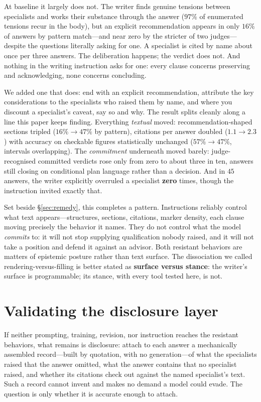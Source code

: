 \documentclass[11pt]{article}
\begin{document}
At baseline it largely does not. The writer finds genuine tensions between
specialists and works their substance through the answer ($97\%$ of
enumerated tensions recur in the body), but an explicit recommendation
appears in only $16\%$ of answers by pattern match---and near zero by the
stricter of two judges---despite the questions literally asking for one. A
specialist is cited by name about once per three answers. The deliberation
happens; the verdict does not. And nothing in the writing instruction asks
for one: every clause concerns preserving and acknowledging, none concerns
concluding.

We added one that does: end with an explicit recommendation, attribute the
key considerations to the specialists who raised them by name, and where you
discount a specialist's caveat, say so and why. The result splits cleanly
along a line this paper keeps finding. Everything \emph{textual} moved:
recommendation-shaped sections tripled ($16\% \rightarrow 47\%$ by pattern),
citations per answer doubled ($1.1 \rightarrow 2.3$) with accuracy on
checkable figures statistically unchanged ($57\% \rightarrow 47\%$,
intervals overlapping). The \emph{commitment} underneath moved barely:
judge-recognised committed verdicts rose only from zero to about three in
ten, answers still closing on conditional plan language rather than a
decision. And in $45$ answers, the writer explicitly overruled a specialist
\textbf{zero} times, though the instruction invited exactly that.

Set beside \S\ref{sec:remedy}, this completes a pattern. Instructions
reliably control what text appears---structures, sections, citations, marker
density, each clause moving precisely the behavior it names. They do not
control what the model \emph{commits} to: it will not stop supplying
qualification nobody raised, and it will not take a position and defend it
against an advisor. Both resistant behaviors are matters of epistemic
posture rather than text surface. The dissociation we called
rendering-versus-filling is better stated as \textbf{surface versus
stance}: the writer's surface is programmable; its stance, with every tool
tested here, is not.

\section{Validating the disclosure layer}
\label{sec:manifest}
If neither prompting, training, revision, nor instruction reaches the
resistant behaviors, what remains is disclosure: attach to each answer a
mechanically assembled record---built by quotation, with no generation---of
what the specialists raised that the answer omitted, what the answer
contains that no specialist raised, and whether its citations check out
against the named specialist's text. Such a record cannot invent and makes
no demand a model could evade. The question is only whether it is accurate
enough to attach.
\end{document}

